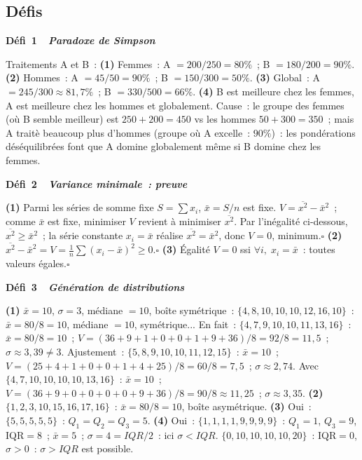 \subsection*{D\'efis}

\noindent{}
{\color{BO}\bfseries\small D\'efi~1~\textendash\ \textit{Paradoxe de Simpson}}
\par\smallskip

Traitements A et B~:
\textbf{(1)} Femmes~: A $=200/250=80\%$~; B $=180/200=90\%$.
\textbf{(2)} Hommes~: A $=45/50=90\%$~; B $=150/300=50\%$.
\textbf{(3)} Global~: A $=245/300\approx81{,}7\%$~; B $=330/500=66\%$.
\textbf{(4)} B est meilleure chez les femmes, A est meilleure chez les hommes et globalement.
Cause~: le groupe des femmes (o\`u B semble meilleur) est $250+200=450$ vs les hommes $50+300=350$~;
mais A trait\`e beaucoup plus d'hommes (groupe o\`u A excelle~: $90\%$)~:
les pond\'erations d\'es\'equilibr\'ees font que A domine globalement m\^eme si B domine chez les femmes.

\noindent{}
{\color{BO}\bfseries\small D\'efi~2~\textendash\ \textit{Variance minimale~: preuve}}
\par\smallskip

\textbf{(1)} Parmi les s\'eries de somme fixe $S=\sum x_i$, $\bar{x}=S/n$ est fixe.
$V=\overline{x^2}-\bar{x}^2$~; comme $\bar{x}$ est fixe, minimiser $V$ revient \`a minimiser $\overline{x^2}$.
Par l'in\'egalit\'e ci-dessous, $\overline{x^2}\geq\bar{x}^2$~; la s\'erie constante $x_i=\bar{x}$
r\'ealise $\overline{x^2}=\bar{x}^2$, donc $V=0$, minimum.\hfill$\square$
\textbf{(2)} $\overline{x^2}-\bar{x}^2=V=\frac{1}{n}\sum(x_i-\bar{x})^2\geq0$.\hfill$\square$
\textbf{(3)} \'Egalit\'e $V=0$ ssi $\forall i,\;x_i=\bar{x}$~: toutes valeurs \'egales.\hfill$\square$

\noindent{}
{\color{BO}\bfseries\small D\'efi~3~\textendash\ \textit{G\'en\'eration de distributions}}
\par\smallskip

\textbf{(1)} $\bar{x}=10$, $\sigma=3$, m\'ediane $=10$, bo\^ite sym\'etrique~:
$\{4,8,10,10,10,12,16,10\}$~: $\bar{x}=80/8=10$, m\'ediane $=10$, sym\'etrique...
En fait~: $\{4,7,9,10,10,11,13,16\}$~: $\bar{x}=80/8=10$~;
$V=(36+9+1+0+0+1+9+36)/8=92/8=11{,}5$~; $\sigma\approx3{,}39\ne3$.
Ajustement~: $\{5,8,9,10,10,11,12,15\}$~: $\bar{x}=10$~;
$V=(25+4+1+0+0+1+4+25)/8=60/8=7{,}5$~; $\sigma\approx2{,}74$.
Avec $\{4,7,10,10,10,10,13,16\}$~: $\bar{x}=10$~;
$V=(36+9+0+0+0+0+9+36)/8=90/8\approx11{,}25$~; $\sigma\approx3{,}35$.
\textbf{(2)} $\{1,2,3,10,15,16,17,16\}$~: $\bar{x}=80/8=10$, bo\^ite asym\'etrique.
\textbf{(3)} Oui~: $\{5,5,5,5,5\}$~: $Q_1=Q_2=Q_3=5$.
\textbf{(4)} Oui~: $\{1,1,1,1,9,9,9,9\}$~: $Q_1=1$, $Q_3=9$, IQR$=8$~;
$\bar{x}=5$~; $\sigma=4=IQR/2$~: ici $\sigma<IQR$.
$\{0,10,10,10,10,20\}$~: IQR$=0$, $\sigma>0$~: $\sigma>IQR$ est possible.

